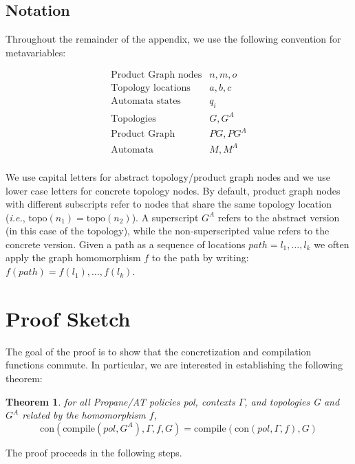 \documentclass[twocolumn, openany]{sig-alternate-10pt}
\newcommand{\IE}{\emph{i.e.}}
\newcommand{\sysname}{{\small \sf Propane/AT}\xspace}
\newcommand{\Con}{\mathrm{con}}
\newcommand{\Compile}{\ensuremath{\mathrm{compile}}}
\newcommand{\Topo}{\ensuremath{\mathrm{topo}}}
\newtheorem{thm}{Theorem}
\begin{document}
\subsection{Notation}

Throughout the remainder of the appendix, we use the following convention for metavariables:

\[ \begin{array}{ll}
  \text{Product Graph nodes} & n,m,o \\
  \text{Topology locations} & a,b,c \\
  \text{Automata states} & q_i \\
  \text{Topologies} & G, G^A \\
  \text{Product Graph} & PG, PG^A \\
  \text{Automata} & M, M^A \\
\end{array} \]

We use capital letters for abstract topology/product graph nodes and we use lower case letters for concrete topology nodes. By default, product graph nodes with different subscripts refer to nodes that share the same topology location (\IE, $\Topo(n_1) = \Topo(n_2)$). A superscript $G^A$ refers to the abstract version (in this case of the topology), while the non-superscripted value refers to the concrete version. Given a path as a sequence of locations $path = l_1, \dots, l_k$ we often apply the graph homomorphism $f$ to the path by writing: $f(path) = f(l_1), \dots, f(l_k)$.


\newpage

\section{Proof Sketch}
\vspace{1em}

The goal of the proof is to show that the concretization and compilation functions commute. In particular, we are interested in establishing the following theorem:

\begin{thm}
  for all \sysname policies pol, contexts $\Gamma$, and topologies G and $G^A$ related by the homomorphism $f$, 
  $$\Con(\Compile(pol,G^A),\Gamma,f,G) = \Compile(\Con(pol,\Gamma,f), G)$$
\end{thm}

The proof proceeds in the following steps. 
\end{document}
